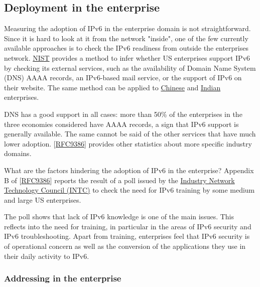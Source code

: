 \documentclass[
]{article}
\begin{document}
\subsection{Deployment in the
enterprise}\label{deployment-in-the-enterprise}

Measuring the adoption of IPv6 in the enterprise domain is not
straightforward. Since it is hard to look at it from the network
"inside", one of the few currently available approaches is to check the
IPv6 readiness from outside the enterprise\textquotesingle s network.
\href{https://fedv6-deployment.antd.nist.gov/cgi-bin/generate-com}{NIST}
provides a method to infer whether US enterprises support IPv6 by
checking its external services, such as the availability of Domain Name
System (DNS) AAAA records, an IPv6-based mail service, or the support of
IPv6 on their website. The same method can be applied to
\href{http://218.2.231.237:5001/cgi-bin/generate}{Chinese} and
\href{https://cnlabs.in/IPv6_Mon/generate_industry.html}{Indian}
enterprises.

DNS has a good support in all cases: more than 50\% of the enterprises
in the three economies considered have AAAA records, a sign that IPv6
support is generally available. The same cannot be said of the other
services that have much lower adoption.
{[}\href{https://www.rfc-editor.org/info/rfc9386}{RFC9386}{]} provides
other statistics about more specific industry domains.

What are the factors hindering the adoption of IPv6 in the enterprise?
Appendix B of
{[}\href{https://www.rfc-editor.org/info/rfc9386}{RFC9386}{]} reports
the result of a poll issued by the
\href{https://industrynetcouncil.org/}{Industry Network Technology
Council (INTC)} to check the need for IPv6 training by some medium and
large US enterprises.

The poll shows that lack of IPv6 knowledge is one of the main issues.
This reflects into the need for training, in particular in the areas of
IPv6 security and IPv6 troubleshooting. Apart from training, enterprises
feel that IPv6 security is of operational concern as well as the
conversion of the applications they use in their daily activity to IPv6.

\subsubsection{Addressing in the
enterprise}\label{addressing-in-the-enterprise}
\end{document}
